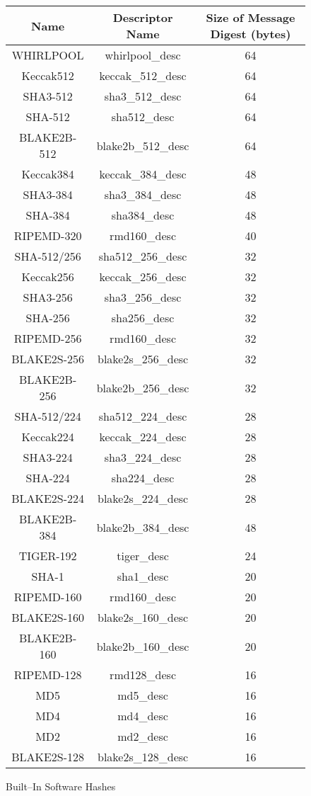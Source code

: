 \documentclass[synpaper]{book}
\begin{document}
\begin{figure}[H]
\begin{center}
\begin{tabular}{|c|c|c|}
      \hline \textbf{Name} & \textbf{Descriptor Name} & \textbf{Size of Message Digest (bytes)} \\
      \hline WHIRLPOOL & whirlpool\_desc & 64 \\
      \hline Keccak512 & keccak\_512\_desc & 64 \\
      \hline SHA3-512 & sha3\_512\_desc & 64 \\
      \hline SHA-512 & sha512\_desc & 64 \\
      \hline BLAKE2B-512 & blake2b\_512\_desc & 64 \\
      \hline Keccak384 & keccak\_384\_desc & 48 \\
      \hline SHA3-384 & sha3\_384\_desc & 48 \\
      \hline SHA-384 & sha384\_desc & 48 \\
      \hline RIPEMD-320 & rmd160\_desc & 40 \\
      \hline SHA-512/256 & sha512\_256\_desc & 32 \\
      \hline Keccak256 & keccak\_256\_desc & 32 \\
      \hline SHA3-256 & sha3\_256\_desc & 32 \\
      \hline SHA-256 & sha256\_desc & 32 \\
      \hline RIPEMD-256 & rmd160\_desc & 32 \\
      \hline BLAKE2S-256 & blake2s\_256\_desc & 32 \\
      \hline BLAKE2B-256 & blake2b\_256\_desc & 32 \\
      \hline SHA-512/224 & sha512\_224\_desc & 28 \\
      \hline Keccak224 & keccak\_224\_desc & 28 \\
      \hline SHA3-224 & sha3\_224\_desc & 28 \\
      \hline SHA-224 & sha224\_desc & 28 \\
      \hline BLAKE2S-224 & blake2s\_224\_desc & 28 \\
      \hline BLAKE2B-384 & blake2b\_384\_desc & 48 \\
      \hline TIGER-192 & tiger\_desc & 24 \\
      \hline SHA-1 & sha1\_desc & 20 \\
      \hline RIPEMD-160 & rmd160\_desc & 20 \\
      \hline BLAKE2S-160 & blake2s\_160\_desc & 20 \\
      \hline BLAKE2B-160 & blake2b\_160\_desc & 20 \\
      \hline RIPEMD-128 & rmd128\_desc & 16 \\
      \hline MD5 & md5\_desc & 16 \\
      \hline MD4 & md4\_desc & 16 \\
      \hline MD2 & md2\_desc & 16 \\
      \hline BLAKE2S-128 & blake2s\_128\_desc & 16 \\
      \hline
\end{tabular}
\end{center}
\caption{Built--In Software Hashes}
\end{figure}
\vfil
\end{document}
